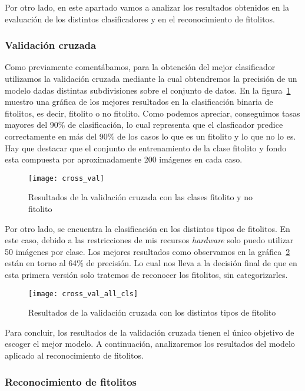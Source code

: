 Por otro lado, en este apartado vamos a analizar los resultados obtenidos en la evaluación de los distintos clasificadores y en el reconocimiento de fitolitos.

\subsubsection{Validación cruzada}

Como previamente comentábamos, para la obtención del mejor clasificador utilizamos la validación cruzada mediante la cual obtendremos la precisión de un modelo dadas distintas subdivisiones sobre el conjunto de datos. En la figura~\ref{fig:cross_val} muestro una gráfica de los mejores resultados en la clasificación binaria de fitolitos, es decir, fitolito o no fitolito. Como podemos apreciar, conseguimos tasas mayores del 90\% de clasificación, lo cual representa que el clasficador predice correctamente en más del 90\% de los casos lo que es un fitolito y lo que no lo es. Hay que destacar que el conjunto de entrenamiento de la clase fitolito y fondo esta compuesta por aproximadamente 200 imágenes en cada caso. 

\begin{figure}
\centering
\texttt{[image: cross\_val]}
\caption{Resultados de la validación cruzada con las clases fitolito y no fitolito}
\label{fig:cross_val}
\end{figure}

Por otro lado, se encuentra la clasificación en los distintos tipos de fitolitos. En este caso, debido a las restricciones de mis recursos \textit{hardware} solo puedo utilizar 50 imágenes por clase. Los mejores resultados como observamos en la gráfica~\ref{fig:cross_val_all} están en torno al 64\% de precisión. Lo cual nos lleva a la decisión final de que en esta primera versión solo tratemos de reconocer los fitolitos, sin categorizarles.

\begin{figure}
\centering
\texttt{[image: cross\_val\_all\_cls]}
\caption{Resultados de la validación cruzada con los distintos tipos de fitolito}
\label{fig:cross_val_all}
\end{figure}

Para concluir, los resultados de la validación cruzada tienen el único objetivo de escoger el mejor modelo. A continuación, analizaremos los resultados del modelo aplicado al reconocimiento de fitolitos.

\subsubsection{Reconocimiento de fitolitos}


